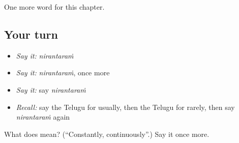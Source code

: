 \begin{grammarlens}[title={What you've built}]
One more word for this chapter.
\end{grammarlens}

\subsection*{Your turn}
\begin{itemize}
\raggedright
  \item \emph{Say it:} \emph{nirantaraṁ}
  \item \emph{Say it:} \emph{nirantaraṁ}, once more
  \item \emph{Say it:} say \emph{nirantaraṁ}
  \item \emph{Recall:} say the Telugu for usually, then the Telugu for rarely, then say \emph{nirantaraṁ} again
\end{itemize}

\begin{tcolorbox}[breakable,colback=teal!4,colframe=teal!35!black,title={Before you move on}]
What does  mean? (\textquotedblleft{}Constantly, continuously\textquotedblright{}.) Say it once more.
\end{tcolorbox}
